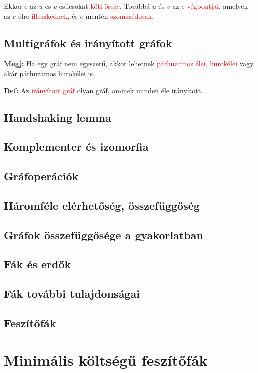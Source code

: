 \documentclass[12pt]{article}
\begin{document}
			Ekkor $e$ az $u$ és $v$ csúcsokat \textcolor{red}{köti össze}. Továbbá $u$ és $v$ az $e$ \textcolor{red}{végpontjai}, amelyek az $e$ élre \textcolor{red}{illeszkednek}, és $e$ mentén \textcolor{red}{szomszédosak}.
		
		\subsection{Multigráfok és irányított gráfok}

			\textbf{Megj:} Ha egy gráf nem egyszerű, akkor lehetnek \textcolor{red}{párhuzamos élei, hurokélei} vagy akár párhuzamos hurokélei is.
			
			\textbf{Def:} Az \textcolor{red}{irányított gráf} olyan gráf, aminek minden éle irányított.



		\subsection{Handshaking lemma}
		\subsection{Komplementer és izomorfia}
		\subsection{Gráfoperációk}
		\subsection{Háromféle elérhetőség, összefüggőség}
		\subsection{Gráfok összefüggősége a gyakorlatban}
		\subsection{Fák és erdők}
		\subsection{Fák további tulajdonságai}
		\subsection{Feszítőfák}
		
		
	\section{Minimális költségű feszítőfák}
\end{document}
